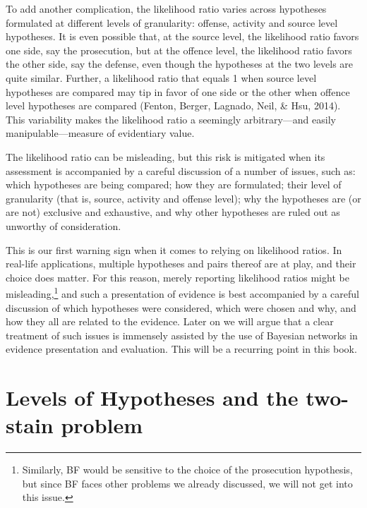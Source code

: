 \documentclass[
  10pt,
  dvipsnames,enabledeprecatedfontcommands]{scrartcl}
\newcommand{\mar}[1]{\todo[color=blue!40]{#1}}
\begin{document}
To add another complication, the likelihood ratio varies across
hypotheses formulated at different levels of granularity: offense,
activity and source level hypotheses. It is even possible that, at the
source level, the likelihood ratio favors one side, say the prosecution,
but at the offence level, the likelihood ratio favors the other side,
say the defense, even though the hypotheses at the two levels are quite
similar. Further, a likelihood ratio that equals 1 when source level
hypotheses are compared may tip in favor of one side or the other when
offence level hypotheses are compared (Fenton, Berger, Lagnado, Neil, \&
Hsu, 2014). This variability makes the likelihood ratio a seemingly
arbitrary---and easily manipulable---measure of evidentiary value.

The likelihood ratio can be misleading, but this risk is mitigated when
its assessment is accompanied by a careful discussion of a number of
issues, such as: which hypotheses are being compared; how they are
formulated; their level of granularity (that is, source, activity and
offense level); why the hypotheses are (or are not) exclusive and
exhaustive, and why other hypotheses are ruled out as unworthy of
consideration.

\mar{Added this summary passage, check.}

This is our first warning sign when it comes to relying on likelihood
ratios. In real-life applications, multiple hypotheses and pairs thereof
are at play, and their choice does matter. For this reason, merely
reporting likelihood ratios might be
misleading,\footnote{Similarly, BF would be sensitive to the choice of the prosecution hypothesis, but since BF faces other problems we already discussed, we will not get into this issue.}
and such a presentation of evidence is best accompanied by a careful
discussion of which hypotheses were considered, which were chosen and
why, and how they all are related to the evidence. Later on we will
argue that a clear treatment of such issues is immensely assisted by the
use of Bayesian networks in evidence presentation and evaluation. This
will be a recurring point in this book.

\hypertarget{levels-of-hypotheses-and-the-two-stain-problem}{%
\section{\texorpdfstring{Levels of Hypotheses and the two-stain problem
\label{sec:lhTwoSTain}}{Levels of Hypotheses and the two-stain problem }}\label{levels-of-hypotheses-and-the-two-stain-problem}}
\end{document}
